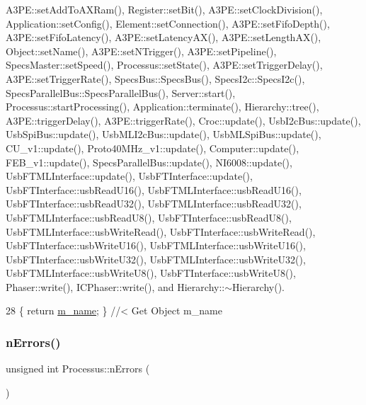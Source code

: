 A3\+P\+E\+::set\+Add\+To\+A\+X\+Ram(), Register\+::set\+Bit(), A3\+P\+E\+::set\+Clock\+Division(), Application\+::set\+Config(), Element\+::set\+Connection(), A3\+P\+E\+::set\+Fifo\+Depth(), A3\+P\+E\+::set\+Fifo\+Latency(), A3\+P\+E\+::set\+Latency\+A\+X(), A3\+P\+E\+::set\+Length\+A\+X(), Object\+::set\+Name(), A3\+P\+E\+::set\+N\+Trigger(), A3\+P\+E\+::set\+Pipeline(), Specs\+Master\+::set\+Speed(), Processus\+::set\+State(), A3\+P\+E\+::set\+Trigger\+Delay(), A3\+P\+E\+::set\+Trigger\+Rate(), Specs\+Bus\+::\+Specs\+Bus(), Specs\+I2c\+::\+Specs\+I2c(), Specs\+Parallel\+Bus\+::\+Specs\+Parallel\+Bus(), Server\+::start(), Processus\+::start\+Processing(), Application\+::terminate(), Hierarchy\+::tree(), A3\+P\+E\+::trigger\+Delay(), A3\+P\+E\+::trigger\+Rate(), Croc\+::update(), Usb\+I2c\+Bus\+::update(), Usb\+Spi\+Bus\+::update(), Usb\+M\+L\+I2c\+Bus\+::update(), Usb\+M\+L\+Spi\+Bus\+::update(), C\+U\+\_\+v1\+::update(), Proto40\+M\+Hz\+\_\+v1\+::update(), Computer\+::update(), F\+E\+B\+\_\+v1\+::update(), Specs\+Parallel\+Bus\+::update(), N\+I6008\+::update(), Usb\+F\+T\+M\+L\+Interface\+::update(), Usb\+F\+T\+Interface\+::update(), Usb\+F\+T\+Interface\+::usb\+Read\+U16(), Usb\+F\+T\+M\+L\+Interface\+::usb\+Read\+U16(), Usb\+F\+T\+Interface\+::usb\+Read\+U32(), Usb\+F\+T\+M\+L\+Interface\+::usb\+Read\+U32(), Usb\+F\+T\+M\+L\+Interface\+::usb\+Read\+U8(), Usb\+F\+T\+Interface\+::usb\+Read\+U8(), Usb\+F\+T\+M\+L\+Interface\+::usb\+Write\+Read(), Usb\+F\+T\+Interface\+::usb\+Write\+Read(), Usb\+F\+T\+Interface\+::usb\+Write\+U16(), Usb\+F\+T\+M\+L\+Interface\+::usb\+Write\+U16(), Usb\+F\+T\+Interface\+::usb\+Write\+U32(), Usb\+F\+T\+M\+L\+Interface\+::usb\+Write\+U32(), Usb\+F\+T\+M\+L\+Interface\+::usb\+Write\+U8(), Usb\+F\+T\+Interface\+::usb\+Write\+U8(), Phaser\+::write(), I\+C\+Phaser\+::write(), and Hierarchy\+::$\sim$\+Hierarchy().


\begin{DoxyCode}
28 \{ \textcolor{keywordflow}{return} \hyperlink{classObject_a8b83c95c705d2c3ba0d081fe1710f48d}{m\_name}; \} \textcolor{comment}{//< Get Object m\_name}
\end{DoxyCode}
\mbox{\label{classProcessus_a82a0487f82f07cc2c2dc2731f98149e7}} 
\subsubsection{\texorpdfstring{n\+Errors()}{nErrors()}}
{\footnotesize\ttfamily unsigned int Processus\+::n\+Errors (\begin{DoxyParamCaption}{ }\end{DoxyParamCaption})\hspace{0.3cm}{\ttfamily [inherited]}}

